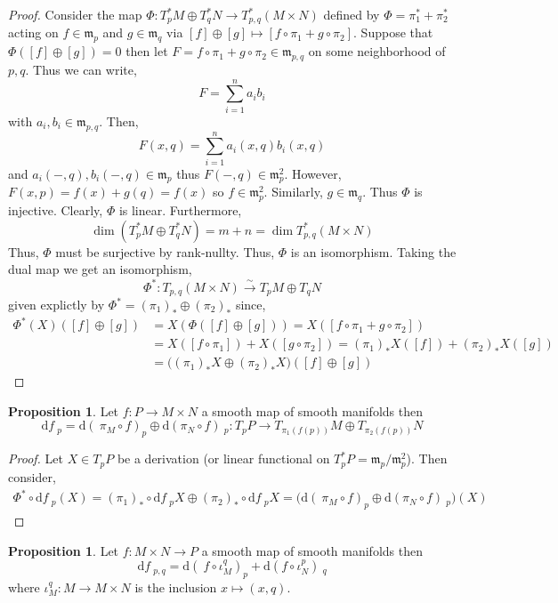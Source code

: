 \documentclass[12pt]{extarticle}
\renewcommand{\d}[1]{ \mathrm{d}#1 \:}
\theoremstyle{definition}
\newtheorem{proposition}[theorem]{Proposition}
\newcommand{\m}{\mathfrak{m}}
\begin{document}
\begin{proof}
Consider the map $\Phi : T_p^* M \oplus T_q^* N \to T_{p,q}^* (M \times N)$ defined by $\Phi = \pi_1^* + \pi_2^*$ acting on $f \in \m_p$ and $g \in \m_q$ via $[f] \oplus [g] \mapsto [f \circ \pi_1 + g \circ \pi_2 ]$.
Suppose that $\Phi([f] \oplus [g]) = 0$ then let $F = f \circ \pi_1 + g \circ \pi_2 \in \m_{p,q}$ on some neighborhood of $p,q$. Thus we can write,
\[ F = \sum_{i = 1}^n a_i b_i \]
with $a_i, b_i \in \m_{p,q}$. Then, 
\[ F(x, q) = \sum_{i = 1}^n a_i(x, q) b_i(x, q) \]
and $a_i(-,q), b_i(-,q) \in \m_p$ thus $F(-,q) \in \m_p^2$.
However, $F(x,p) = f(x) + g(q) = f(x)$ so $f \in \m_p^2$. Similarly, $g \in \m_q$. Thus $\Phi$ is injective. Clearly, $\Phi$ is linear. Furthermore, 
\[ \dim{(T_p^* M \oplus T_q^* N)} = m + n = \dim{T_{p,q}^* (M \times N)} \]
Thus, $\Phi$ must be surjective by rank-nullty. Thus, $\Phi$ is an isomorphism. Taking the dual map we get an isomorphism,
\[ \Phi^* : T_{p,q} (M \times N) \xrightarrow{\sim} T_p M \oplus T_q N \]
given explictly by $\Phi^* = (\pi_1)_* \oplus (\pi_2)_*$ since, 
\begin{align*}
\Phi^*(X)([f]\oplus[g]) & = X(\Phi([f] \oplus [g])) = X([f \circ \pi_1 + g \circ \pi_2]) 
\\
& = X([f \circ \pi_1]) + X([g \circ \pi_2]) = (\pi_1)_* X([f]) + (\pi_2)_* X([g])
\\
& = \Big( (\pi_1)_* X \oplus (\pi_2)_* X \Big) ([f] \oplus [g])
\end{align*}
\end{proof}

\begin{proposition}
Let $f : P \to M \times N$ a smooth map of smooth manifolds then 
\[ \d{f}_p = \d(\pi_M \circ f)_p \oplus \d{(\pi_N \circ f)}_p : T_p P \to T_{\pi_1(f(p))} M \oplus T_{\pi_2(f(p))} N \]
\end{proposition}

\begin{proof}
Let $X \in T_p P$ be a derivation (or linear functional on $T_p^* P = \m_p / \m_p^2$). Then consider,
\begin{align*}
\Phi^* \circ \d{f}_p(X) = (\pi_1)_* \circ \d{f}_p X \oplus (\pi_2)_* \circ \d{f}_p X = \Big( \d(\pi_M \circ f)_p \oplus \d{(\pi_N \circ f)}_p \Big)(X)
\end{align*}
\end{proof}

\begin{proposition}
Let $f : M \times N \to P$ a smooth map of smooth manifolds then 
\[ \d{f}_{p,q} = \d(f \circ \iota_M^q)_p + \d{(f \circ \iota_N^p)}_q \]
where $\iota_M^q : M \to M \times N$ is the inclusion $x \mapsto (x, q)$. 
\end{proposition}
\end{document}
